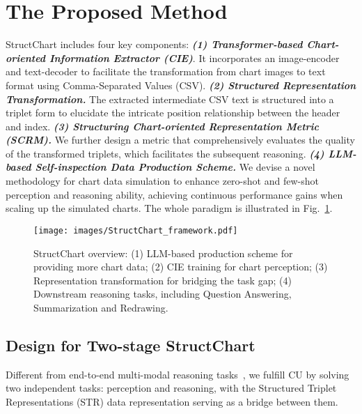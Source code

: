 \documentclass{article} \usepackage{iclr2024_conference,times}
\begin{document}
\section{The Proposed Method}
\vspace{-8pt}
StructChart includes four key components: \textbf{\textit{(1) Transformer-based Chart-oriented Information Extractor (CIE)}}. It incorporates an image-encoder and text-decoder to facilitate the transformation from chart images to text format using Comma-Separated Values (CSV). \textbf{\textit{(2) Structured Representation Transformation.}} The extracted intermediate CSV text is structured into a triplet form to elucidate the intricate position relationship between the header and index. \textbf{\textit{(3) Structuring Chart-oriented Representation Metric
(SCRM).}} We further design a metric that comprehensively evaluates the quality of the transformed triplets, which facilitates the subsequent reasoning. \textbf{\textit{(4) LLM-based Self-inspection Data Production Scheme.}} We devise a novel methodology for chart data simulation to enhance zero-shot and few-shot perception and reasoning ability, achieving continuous performance gains when scaling up the simulated charts. The whole paradigm is illustrated in Fig.~\ref{fig:framework}.


\begin{figure}[tb!]
\vspace{-8pt}
\centering
\texttt{[image: images/StructChart\_framework.pdf]}
\vspace{-6pt}
\caption{StructChart overview: (1) LLM-based production scheme for providing more chart data; (2) CIE training for chart perception; (3) Representation transformation for bridging the task gap; (4) Downstream reasoning tasks, including Question Answering, Summarization and Redrawing.}
\label{fig:framework}
\vspace{-12pt}
\end{figure}

\vspace{-8pt}
\subsection{Design for Two-stage StructChart}
\vspace{-8pt}
Different from end-to-end multi-modal reasoning tasks~\citep{Masry2022ChartQAAB,Obeid2020CharttoTextGN}, we fulfill CU by solving two independent tasks: perception and reasoning, with the Structured Triplet Representations (STR) data representation serving as a bridge between them.
\end{document}
